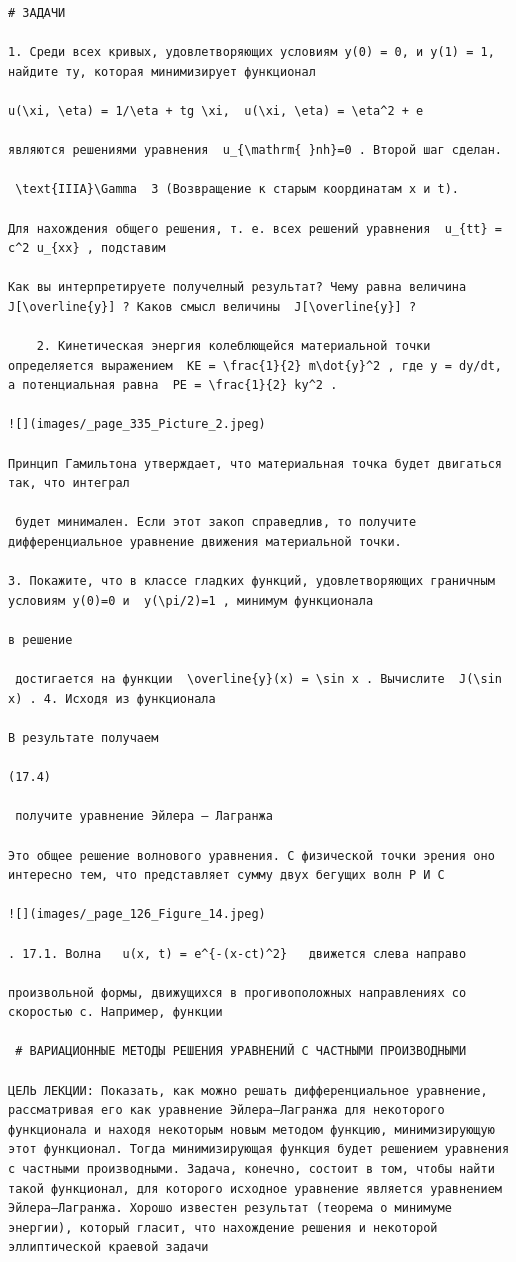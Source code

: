 \documentclass[
  ukrainian,
]{article}
\begin{document}
\begin{verbatim}
# ЗАДАЧИ

1. Среди всех кривых, удовлетворяющих условиям y(0) = 0, и y(1) = 1, найдите ту, которая минимизирует функционал

u(\xi, \eta) = 1/\eta + tg \xi,  u(\xi, \eta) = \eta^2 + e 

являются решениями уравнения  u_{\mathrm{ }nh}=0 . Второй шаг сделан.

 \text{IIIA}\Gamma  3 (Возвращение к старым координатам x и t).

Для нахождения общего решения, т. е. всех решений уравнения  u_{tt} = c^2 u_{xx} , подставим

Как вы интерпретируете получелный результат? Чему равна величина  J[\overline{y}] ? Каков смысл величины  J[\overline{y}] ?

    2. Кинетическая энергия колеблющейся материальной точки определяется выражением  KE = \frac{1}{2} m\dot{y}^2 , где y = dy/dt, а потенциальная равна  PE = \frac{1}{2} ky^2 .

![](images/_page_335_Picture_2.jpeg)

Принцип Гамильтона утверждает, что материальная точка будет двигаться так, что интеграл

 будет минимален. Если этот закоп справедлив, то получите дифференциальное уравнение движения материальной точки.

3. Покажите, что в классе гладких функций, удовлетворяющих граничным условиям y(0)=0 и  y(\pi/2)=1 , минимум функционала

в решение

 достигается на функции  \overline{y}(x) = \sin x . Вычислите  J(\sin x) . 4. Исходя из функционала

В результате получаем

(17.4)

 получите уравнение Эйлера — Лагранжа

Это общее решение волнового уравнения. С физической точки эрения оно интересно тем, что представляет сумму двух бегущих волн Р И С

![](images/_page_126_Figure_14.jpeg)

. 17.1. Волна   u(x, t) = e^{-(x-ct)^2}   движется слева направо

произвольной формы, движущихся в прогивоположных направлениях со скоростью c. Например, функции

 # ВАРИАЦИОННЫЕ МЕТОДЫ РЕШЕНИЯ УРАВНЕНИЙ С ЧАСТНЫМИ ПРОИЗВОДНЫМИ

ЦЕЛЬ ЛЕКЦИИ: Показать, как можно решать дифференциальное уравнение, рассматривая его как уравнение Эйлера—Лагранжа для некоторого функционала и находя некоторым новым методом функцию, минимизирующую этот функционал. Тогда минимизирующая функция будет решением уравнения с частными производными. Задача, конечно, состоит в том, чтобы найти такой функционал, для которого исходное уравнение является уравнением Эйлера—Лагранжа. Хорошо известен результат (теорема о минимуме энергии), который гласит, что нахождение решения и некоторой эллиптической краевой задачи


\end{verbatim}
\end{document}
